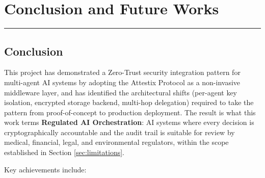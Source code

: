 \chapter{Conclusion and Future Works}
\noindent\rule{\linewidth}{2pt}

\section{Conclusion}

This project has demonstrated a Zero-Trust security integration pattern for multi-agent AI systems by adopting the Attestix Protocol as a non-invasive middleware layer, and has identified the architectural shifts (per-agent key isolation, encrypted storage backend, multi-hop delegation) required to take the pattern from proof-of-concept to production deployment. The result is what this work terms \textbf{Regulated AI Orchestration}: AI systems where every decision is cryptographically accountable and the audit trail is suitable for review by medical, financial, legal, and environmental regulators, within the scope established in Section \ref{sec:limitations}.

Key achievements include:

